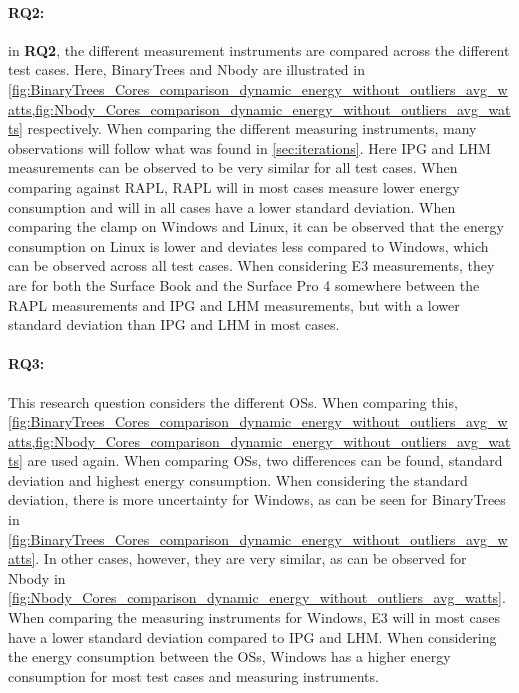 \paragraph*{RQ2:}  in \textbf{RQ2}, the different measurement instruments are compared across the different test cases. Here, BinaryTrees and Nbody are illustrated in  \cref*{fig:BinaryTrees_Cores_comparison_dynamic_energy_without_outliers_avg_watts,fig:Nbody_Cores_comparison_dynamic_energy_without_outliers_avg_watts} respectively. When comparing the different measuring instruments, many observations will follow what was found in \cref{sec:iterations}. Here IPG and LHM measurements can be observed to be very similar for all test cases. When comparing against RAPL, RAPL will in most cases measure lower energy consumption and will in all cases have a lower standard deviation. When comparing the clamp on Windows and Linux, it can be observed that the energy consumption on Linux is lower and deviates less compared to Windows, which can be observed across all test cases. When considering E3 measurements, they are for both the Surface Book and the Surface Pro 4 somewhere between the RAPL measurements and IPG and LHM measurements, but with a lower standard deviation than IPG and LHM in most cases.




\paragraph*{RQ3:} This research question considers the different OSs. When comparing this, \cref*{fig:BinaryTrees_Cores_comparison_dynamic_energy_without_outliers_avg_watts,fig:Nbody_Cores_comparison_dynamic_energy_without_outliers_avg_watts} are used again. When comparing OSs, two differences can be found, standard deviation and highest energy consumption. When considering the standard deviation, there is more uncertainty for Windows, as can be seen for BinaryTrees in \cref*{fig:BinaryTrees_Cores_comparison_dynamic_energy_without_outliers_avg_watts}. In other cases, however, they are very similar, as can be observed for Nbody in \cref*{fig:Nbody_Cores_comparison_dynamic_energy_without_outliers_avg_watts}. When comparing the measuring instruments for Windows, E3 will in most cases have a lower standard deviation compared to IPG and LHM. When considering the energy consumption between the OSs, Windows has a higher energy consumption for most test cases and measuring instruments.

